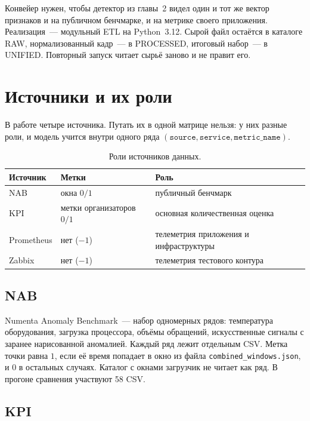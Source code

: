 Конвейер нужен, чтобы детектор из главы~2 видел один и тот же вектор признаков и на публичном бенчмарке, и на метрике своего приложения.
Реализация~--- модульный ETL на Python~3.12.
Сырой файл остаётся в каталоге RAW, нормализованный кадр~--- в PROCESSED, итоговый набор~--- в UNIFIED.
Повторный запуск читает сырьё заново и не правит его.

\section{Источники и их роли}

В работе четыре источника.
Путать их в одной матрице нельзя: у них разные роли, и модель учится внутри одного ряда \((\texttt{source},\texttt{service},\texttt{metric\_name})\).

\begin{table}[ht]
\centering
\begin{tabular}{llp{7.2cm}}
\toprule
Источник & Метки & Роль \\
\midrule
NAB \cite{numenta-nab} & окна \(0/1\) & публичный бенчмарк \\
KPI \cite{kpi-ad} & метки организаторов \(0/1\) & основная количественная оценка \\
Prometheus \cite{prometheus} & нет (\(-1\)) & телеметрия приложения и инфраструктуры \\
Zabbix \cite{zabbix} & нет (\(-1\)) & телеметрия тестового контура \\
\bottomrule
\end{tabular}
\caption{Роли источников данных.}
\end{table}

\subsection{NAB}

Numenta Anomaly Benchmark~--- набор одномерных рядов: температура оборудования, загрузка процессора, объёмы обращений, искусственные сигналы с заранее нарисованной аномалией.
Каждый ряд лежит отдельным CSV.
Метка точки равна \(1\), если её время попадает в окно из файла \texttt{combined\_windows.json}, и \(0\) в остальных случаях.
Каталог с окнами загрузчик не читает как ряд.
В прогоне сравнения участвуют 58 CSV.

\subsection{KPI}

